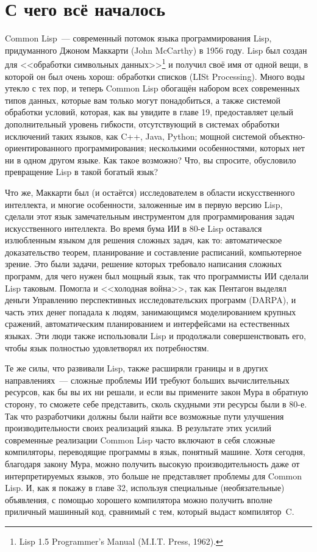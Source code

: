 \section{С чего всё началось}

Common Lisp~--- современный потомок языка программирования Lisp, придуманного Джоном
Маккарти (John McCarthy) в 1956 году. Lisp был создан для <<обработки символьных
данных>>\footnote{Lisp 1.5 Programmer's Manual (M.I.T. Press, 1962).} и получил своё имя от
одной вещи, в которой он был очень хорош: обработки списков (LISt Processing). Много воды
утекло с тех пор, и теперь Common Lisp обогащён набором всех современных типов данных, которые
вам только могут понадобиться, а также системой обработки условий, которая, как вы
увидите в главе 19, предоставляет целый дополнительный уровень гибкости, отсутствующий в системах обработки
исключений таких языков, как C++, Java, Python; мощной системой объектно-ориентированного
программирования; несколькими особенностями, которых нет ни в одном другом языке. Как
такое возможно? Что, вы спросите, обусловило превращение Lisp в такой богатый язык?

Что же, Маккарти был (и остаётся)
исследователем в области искусственного интеллекта, и многие
особенности, заложенные им в первую версию Lisp, сделали этот язык замечательным
инструментом для программирования задач искусственного интеллекта. Во время бума ИИ в 80-е Lisp
оставался излюбленным языком для решения сложных задач, как то: автоматическое
доказательство теорем, планирование и составление расписаний, компьютерное зрение. Это
были задачи, решение которых требовало написания сложных программ, для чего нужен был мощный язык,
так что программисты ИИ сделали Lisp таковым. Помогла и <<холодная война>>, так как Пентагон
выделял деньги Управлению перспективных исследовательских программ (DARPA), и часть этих
денег попадала к людям, занимающимся моделированием крупных сражений, автоматическим
планированием и интерфейсами на естественных языках. Эти люди также использовали Lisp и
продолжали совершенствовать его, чтобы язык полностью удовлетворял их потребностям.

Те же силы, что развивали Lisp, также расширяли границы и в других направлениях~---
сложные проблемы ИИ требуют больших вычислительных ресурсов, как бы вы их ни решали, и
если вы примените закон Мура в обратную сторону, то сможете себе представить, сколь
скудными эти ресурсы были в 80-е. Так что разработчики должны были найти все возможные
пути улучшения производительности своих реализаций языка. В результате этих усилий
современные реализации Common Lisp часто включают в себя сложные компиляторы, переводящие
программы в язык,
понятный машине. Хотя сегодня, благодаря закону Мура, можно получить высокую
производительность даже от интерпретируемых языков, это больше не представляет проблемы для
Common Lisp. И, как я покажу в главе 32, используя специальные (необязательные)
объявления, с помощью хорошего компилятора можно получить вполне приличный машинный код,
сравнимый с тем, который выдаст компилятор~C.

